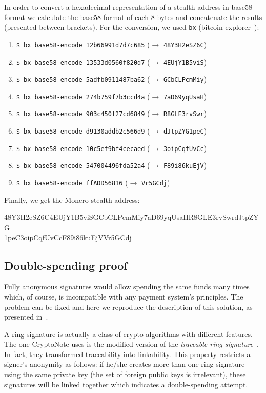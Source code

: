 In order to convert a hexadecimal representation of a stealth address in base58 format we calculate the base58 format of each 8 bytes and concatenate the results (presented between brackets). For the conversion, we used \verb|bx| (bitcoin explorer~\cite{bx}):

\begin{enumerate}
  \item \verb|$ bx base58-encode 12b66991d7d7c685| ($\rightarrow$ \verb|48Y3H2eSZ6C|)
  \item \verb|$ bx base58-encode 13533d0560f820d7| ($\rightarrow$ \verb|4EUjY1B5viS|)
  \item \verb|$ bx base58-encode 5adfb0911487ba62| ($\rightarrow$ \verb|GCbCLPcmMiy|)
  \item \verb|$ bx base58-encode 274b759f7b3ccd4a| ($\rightarrow$ \verb|7aD69yqUsaH|)
  \item \verb|$ bx base58-encode 903c450f27cd6849| ($\rightarrow$ \verb|R8GLE3rvSwr|)
  \item \verb|$ bx base58-encode d9130addb2c566d9| ($\rightarrow$ \verb|dJtpZYG1peC|)
  \item \verb|$ bx base58-encode 10c5ef9bf4cecaed| ($\rightarrow$ \verb|3oipCqfUvCc|)
  \item \verb|$ bx base58-encode 547004496fda52a4| ($\rightarrow$ \verb|F89i86kuEjV|)
  \item \verb|$ bx base58-encode ffADD56816| ($\rightarrow$ \verb|Vr5GCdj|)
\end{enumerate}

Finally, we get the Monero stealth address:
\vspace{0.3cm}
\begin{tcolorbox}[colback=green!5!white,colframe=green!65!black]
  \small{48Y3H2eSZ6C4EUjY1B5viSGCbCLPcmMiy7aD69yqUsaHR8GLE3rvSwrdJtpZYG\\
  1peC3oipCqfUvCcF89i86kuEjVVr5GCdj}
\end{tcolorbox}
\clearpage
\pagebreak

\subsection{Double-spending proof}
Fully anonymous signatures would allow spending the same funds many times which, of course, is incompatible with any payment system's principles. The problem can be fixed and here we reproduce the description of this solution, as presented in~\cite{cryptonote}.

A ring signature is actually a class of crypto-algorithms with different features. The one CryptoNote uses is the modified version of the \emph{traceable ring signature}~\cite{traceable2}. In fact, they transformed traceability into linkability. This property restricts a signer's anonymity as follows: if he/she creates more than one ring signature using the same private key (the set of foreign public keys is irrelevant), these signatures will be linked together which indicates a double-spending attempt.

